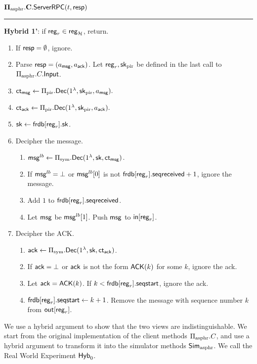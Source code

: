 \vspace{10pt}
$\mathbf{\Pi_{\text{asphr}}.C.\mathsf{ServerRPC}}(t, \mathsf{resp})$
\vspace{5pt}
\hrule
\vspace{5pt}
{\color{red} \textbf{Hybrid 1'}: if $\mathsf{reg}_r \in \mathsf{reg}_{\mathcal{H}}$, return.}
\begin{enumerate}
    \item If $\mathsf{resp} = \emptyset$, ignore.
    \item Parse $\mathsf{resp} = (a_{\mathsf{msg}}, a_{\mathsf{ack}})$. Let $\mathsf{reg}_r, {\mathsf{sk}}_{\text{pir}}$ be defined in the last call to $\Pi_{\text{asphr}}.C.\mathsf{Input}$.
    \item $\mathsf{ct}_{\mathsf{msg}} \leftarrow \Pi_{\text{pir}}.\mathsf{Dec}(1^{\lambda}, {\mathsf{sk}}_{\text{pir}}, a_{\mathsf{msg}}).$
    \item $\mathsf{ct}_{\mathsf{ack}} \leftarrow \Pi_{\text{pir}}.\mathsf{Dec}(1^{\lambda}, {\mathsf{sk}}_{\text{pir}}, a_{\mathsf{ack}}).$
    \item ${\mathsf{sk}} \leftarrow \mathsf{frdb}[\mathsf{reg}_r].{\mathsf{sk}}$.
    \item Decipher the message.
    \begin{enumerate}
        \item $\mathsf{msg}^{lb} \leftarrow \Pi_{\text{sym}}.\mathsf{Dec}(1^{\lambda}, {\mathsf{sk}}, \mathsf{ct}_{\mathsf{msg}})$.
        \item If $\mathsf{msg}^{lb} = \bot$ or $\mathsf{msg}^{lb}[0]$ is not $\mathsf{frdb}[\mathsf{reg}_r].\mathsf{seqreceived} + 1$, ignore the message.
        \item Add $1$ to $\mathsf{frdb}[\mathsf{reg}_r].\mathsf{seqreceived}$. 
        \item Let $\mathsf{msg}$ be $\mathsf{msg}^{lb}[1]$. Push $\mathsf{msg}$ to $\mathsf{in}[\mathsf{reg}_r]$.
    \end{enumerate}
    \item Decipher the ACK.
    \begin{enumerate}
        \item $\mathsf{ack} \leftarrow \Pi_{\text{sym}}.\mathsf{Dec}(1^{\lambda}, {\mathsf{sk}}, \mathsf{ct}_{\mathsf{ack}})$.
        \item If $\mathsf{ack} = \bot$ or $\mathsf{ack}$ is not the form $\mathsf{ACK}(k)$ for some $k$, ignore the ack.
        \item Let $\mathsf{ack} = \mathsf{ACK}(k)$. If $k < \mathsf{frdb}[\mathsf{reg}_r].\mathsf{seqstart}$, ignore the ack.
        \item $\mathsf{frdb}[\mathsf{reg}_r].\mathsf{seqstart} \leftarrow k + 1$. Remove the message with sequence number $k$ from $\mathsf{out}[\mathsf{reg}_r]$.
    \end{enumerate}
\end{enumerate}

We use a hybrid argument to show that the two views are indistinguishable. We start from the original implementation of the client methods $\Pi_{\text{asphr}}.C$, and use a hybrid argument to transform it into the simulator methods $\mathsf{Sim}_{\text{asphr}}$. We call the Real World Experiment $\mathsf{Hyb}_0$.  

